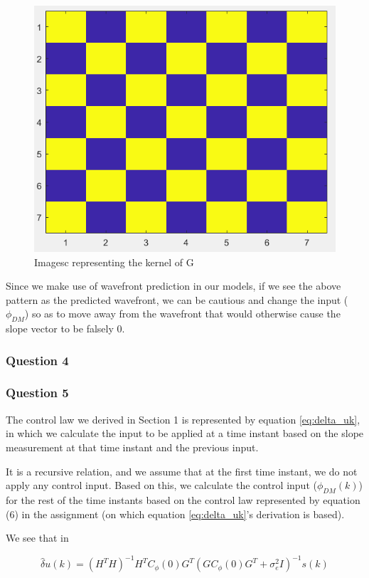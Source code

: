 \documentclass[12pt]{report}
\begin{document}
\begin{figure}[!h]
	\centering
	\includegraphics[width=0.7\linewidth]{G_nullSpaceVectors}
	\caption{Imagesc representing the kernel of G}
	\label{fig:gnullspacevectors}
\end{figure}

Since we make use of wavefront prediction in our models, if we see the above pattern as the predicted wavefront, we can be cautious and change the input ($\phi_{DM}$) so as to move away from the wavefront that would otherwise cause the slope vector to be falsely 0.

\subsubsection*{Question 4}


\subsubsection*{Question 5}
The control law we derived in Section 1 is represented by equation \ref{eq:delta_uk}, in which we calculate the input to be applied at a time instant based on the slope measurement at that time instant and the previous input.

It is a recursive relation, and we assume that at the first time instant, we do not apply any control input. Based on this, we calculate the control input ($\phi_{DM}(k)$) for the rest of the time instants based on the control law represented by equation (6) in the assignment (on which equation \ref{eq:delta_uk}'s derivation is based).

We see that in

\begin{equation*}
\hat\delta u(k) = (H^{T}H)^{-1}H^{T}C_{\phi}(0)G^{T}(GC_{\phi}(0)G^{T} + \sigma_{e}^{2}I)^{-1}s(k)
\end{equation*}
\end{document}

